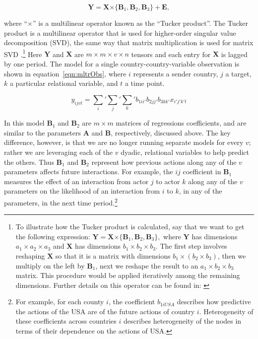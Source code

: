 \documentclass[3p,times,twocolumn,authoryear,12pt]{elsarticle}
\newcommand{\bl}[1]{{\mathbf #1}}
\begin{document}
\begin{equation}  
	\bl Y = \bl X \boldsymbol{\times} \{ \bl B_{1}, \bl B_{2}, \bl B_3\} + \bl E ,  
	\label{eqn:mltr}
\end{equation}

\noindent where ``$\boldsymbol{\times}$'' is a multilinear operator known as the ``Tucker product''. The Tucker product is a multilinear operator that is used for higher-order singular value decomposition (SVD), the same way that matrix multiplication is used for matrix SVD \citep{lathauwer:etal:2000, kolda:bader:2009}.\footnote{To illustrate how the Tucker product is calculated, say that we want to get the following expression: $\bl Y = \bl X \boldsymbol{\times} \{ \bl B_{1}, \bl B_{2}, \bl B_{3}\},$ where $\bl Y$ has dimensions $a_{1} \times a_{2} \times a_{3}$ and $\bl X$ has dimensions $b_{1} \times b_{2} \times b_{3}$. The first step involves reshaping $\bl X$ so that it is a matrix with  dimensions $b_{1} \times (b_{2} \times b_{3})$, then we multiply on the left by $\bl B_{1}$, next we reshape the result to an $a_{1} \times b_{2} \times b_{3}$ matrix. This procedure would be applied iteratively among the remaining dimensions. Further details on this operator can be found in: \citet{kolda:2006, hoff:2011}} Here $\bl Y$ and $\bl X$ are $m \times m \times v \times n$ tensors and each entry for $\bl X$ is lagged by one period. The model for a single country-country-variable observation is shown in equation~\ref{eqn:mltrObs}, where $i$ represents a sender country, $j$ a target, $k$ a particular relational variable, and $t$ a time point. 

\begin{equation}  
	y_{ijvt} = \sum_i' \sum_j' \sum_k' b_{1ii'} b_{2jj'} b_{3kk'} x_{i'j'k't}
	\label{eqn:mltrObs}
\end{equation}

In this model $\bl B_{1}$ and $\bl B_{2}$ are $m \times m$ matrices of regressions coefficients, and are similar to the parameters $\bl A$ and $\bl B$, respectively, discussed above. The key difference, however, is that we are no longer running separate models for every $v$; rather we are leveraging each of the $v$ dyadic, relational variables to help predict the others. Thus $\bl B_{1}$ and $\bl B_{2}$ represent how previous actions along any of the $v$ parameters affects future interactions. For example, the $i j$ coefficient in $\bl B_{1}$ measures the effect of an interaction from actor $j$ to actor $k$ along any of the $v$ parameters on the likelihood of an interaction from $i$ to $k$, in any of the parameters, in the next time period.\footnote{For example, for each county $i$, the coefficient $b_{1iUSA}$ describes how predictive the actions of the USA are of the future actions of country $i$. Heterogeneity of these coefficients across countries $i$ describes heterogeneity of the nodes in terms of their dependence on the actions of USA.}
\end{document}
